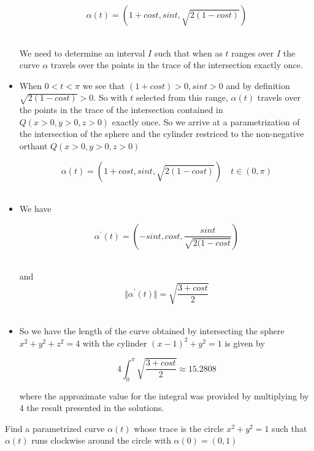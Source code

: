 \documentclass[12pt,letterpaper]{hmcpset}
\begin{document}
\begin{solution}
\begin{itemize}
\[ \alpha(t)= (1+cost, sint, \sqrt{2(1-cost)}) \]\

We need to determine an interval $I$ such that when as $t$ ranges over $I$ the curve $\alpha$ travels over the points in the trace of the intersection exactly once.

\newpage

\item When $0< t < \pi$ we see that $(1+cost) >0, sint>0 $ and by definition $\sqrt{2(1-cost)}>0$.  So with $t$ selected from this range, $\alpha(t)$  travels over the points in the trace of the intersection contained in  $Q(x>0, y>0,z>0)$ exactly once.
So we arrive at a parametrization of the intersection of the sphere and the cylinder restriced to the non-negative orthant $Q(x>0, y>0,z>0)$

\[ \alpha(t) =(1+cost, sint, \sqrt{2(1-cost)})\quad t \in (0,\pi) \]\

\item We have

\[ \alpha^{\prime}(t) = \left(-sint,cost,\frac{sint}{\sqrt{2(1-cost}} \right) \]\

and 
\[ \Vert \alpha^{\prime}(t) \Vert  = \sqrt{ \frac{3+cost}{2}} \]\


\item  So we have the length of the curve obtained by intersecting the sphere $x^2+y^2+z^2 =4$ with the cylinder $(x-1)^2 +y^2 =1$ is given by

\[ 4 \int_0^{\pi} \sqrt{ \frac{3+cost}{2}}  \approx 15.2808 \]

where the approximate value for the integral was provided by multiplying by 4 the result presented in the solutions.  
 \end{itemize}


\end{solution}

\newpage

\begin{problem}
Find a parametrized curve $\alpha(t)$ whose trace is the circle $x^2 + y^2 = 1 $ such that $\alpha(t)$ runs clockwise around the circle with $\alpha(0) =(0,1)$
\end{problem}
\end{document}
